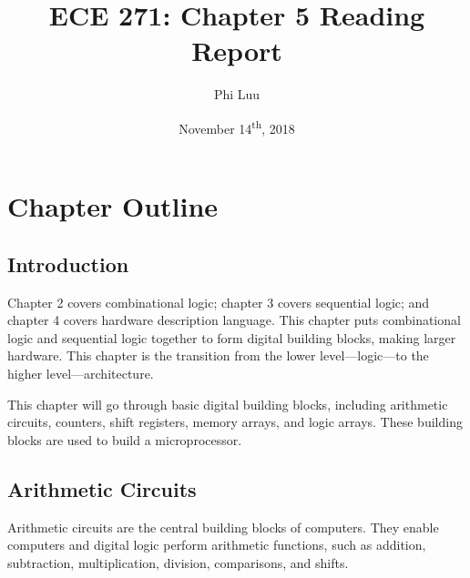\documentclass[12pt]{article}
\title{ECE 271: Chapter 5 Reading Report}
\author{Phi Luu}
\date{November 14\textsuperscript{th}, 2018}
\begin{document}
\maketitle

\section{Chapter Outline}

\subsection{Introduction}

Chapter 2 covers combinational logic; chapter 3 covers sequential logic; and chapter 4 covers hardware description language. This chapter puts combinational logic and sequential logic together to form digital building blocks, making larger hardware. This chapter is the transition from the lower level---logic---to the higher level---architecture.

This chapter will go through basic digital building blocks, including arithmetic circuits, counters, shift registers, memory arrays, and logic arrays. These building blocks are used to build a microprocessor.

\subsection{Arithmetic Circuits}

Arithmetic circuits are the central building blocks of computers. They enable computers and digital logic perform arithmetic functions, such as addition, subtraction, multiplication, division, comparisons, and shifts.
\end{document}
